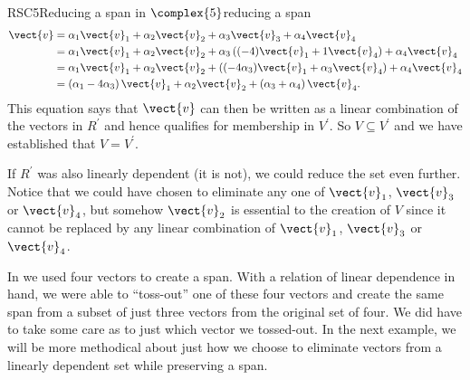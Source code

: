 \begin{example}{RSC5}{Reducing a span in $\complex{5}$}{reducing a span}
%
\begin{align*}
\vect{v}&=
%
\alpha_1\vect{v}_1+\alpha_2\vect{v}_2+\alpha_3\vect{v}_3+\alpha_4\vect{v}_4\\
%
&=\alpha_1\vect{v}_1+\alpha_2\vect{v}_2+
\alpha_3\left((-4)\vect{v}_1+1\vect{v}_4\right)+
\alpha_4\vect{v}_4\\
%
&=\alpha_1\vect{v}_1+\alpha_2\vect{v}_2+
\left((-4\alpha_3)\vect{v}_1+\alpha_3\vect{v}_4\right)+
\alpha_4\vect{v}_4\\
%
&=\left(\alpha_1-4\alpha_3\right)\vect{v}_1+
\alpha_2\vect{v}_2+
\left(\alpha_3+\alpha_4\right)\vect{v}_4.
\end{align*}
%
This equation says that $\vect{v}$ can then be written as a linear combination of the vectors in $R^\prime$ and hence qualifies for membership in $V^\prime$.  So $V\subseteq V^\prime$ and we have established that $V=V^\prime$.\par
%
If $R^\prime$ was also linearly dependent (it is not), we could reduce the set even further.  Notice that we could have chosen to eliminate any one of $\vect{v}_1$, $\vect{v}_3$ or $\vect{v}_4$, but somehow $\vect{v}_2$ is essential to the creation of $V$ since it cannot be replaced by any linear combination of $\vect{v}_1$, $\vect{v}_3$ or $\vect{v}_4$.
%
\end{example}
%
%
In  we used four vectors to create a span.  With a relation of linear dependence in hand, we were able to ``toss-out'' one of these four vectors and create the same span from a subset of just three vectors from the original set of four.  We did have to take some care as to just which vector we tossed-out.  In the next example, we will be more methodical about just how we choose to eliminate vectors from a linearly dependent set while preserving a span.
